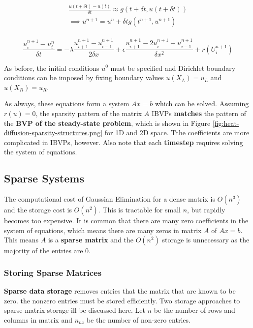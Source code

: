 \documentclass{article}
\begin{document}
\begin{multline}\\
	\frac{u(t + \delta t) - u(t)}{\delta t} \approx g(t + \delta t, u(t + \delta t)) \\
	\implies u^{n+1}= u^n + \delta t g(t^{n+1}, u^{n+1})
	\label{eq:ibvp-backward-euler}
\\ \end{multline}

\begin{equation}
	\frac{u_i^{n + 1} - u_i^n}{\delta t} = -\lambda \frac{u_{i+1}^{n+1} - u_{i-1}^{n+1}}{2 \delta x} + \epsilon \frac{u_{i+1}^{n+1} - 2u_{i}^{n+1} + u_{i-1}^{n+1}}{\delta x^2} + r(U_i^{n+1})
	\label{eq:ivbp-approx-final2}
\end{equation}

As before, the initial conditions $u^0$ must be specified and Dirichlet boundary conditions can be imposed by fixing boundary values $u(X_L) = u_L$ and $u(X_R) = u_R$. 

As always, these equations form a system $Ax = b$ which can be solved. Assuming $r(u) = 0$, the sparsity pattern of the matrix $A$ IBVPs \textbf{matches} the pattern of the \textbf{BVP of the steady-state problem}, which is shown in Figure \ref{fig:heat-diffusion-sparsity-structures.png} for 1D and 2D space. Tthe coefficients are more complicated in IBVPs, however. Also note that each \textbf{timestep} requires solving the system of equations.

\subsection{Sparse Systems}

The computational cost of Gaussian Elimination for a dense matrix is $O(n^3)$ and the storage cost is $O(n^2)$. This is tractable for small $n$, but rapidly becomes too expensive. It is common that there are many zero coefficients in the system of equations, which means there are many zeros in matrix $A$ of $Ax = b$. This means $A$ is a \textbf{sparse matrix} and the $O(n^2)$ storage is unnecessary as the majority of the entries are 0.

\subsubsection{Storing Sparse Matrices}

\textbf{Sparse data storage} removes entries that the matrix that are known to be zero. the nonzero entries must be stored efficiently. Two storage approaches to sparse matrix storage ill be discussed here. Let $n$ be the number of rows and columns in matrix and $n_{nz}$ be the number of non-zero entries.
\end{document}
